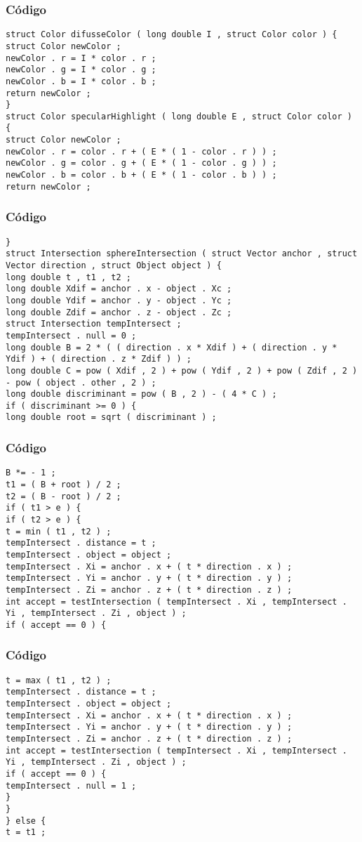 \documentclass{beamer}
\begin{document}
\begin{frame}[fragile]
\frametitle{C\'odigo}
\begin{verbatim}
struct Color difusseColor ( long double I , struct Color color ) { 
struct Color newColor ; 
newColor . r = I * color . r ; 
newColor . g = I * color . g ; 
newColor . b = I * color . b ; 
return newColor ; 
} 
struct Color specularHighlight ( long double E , struct Color color ) { 
struct Color newColor ; 
newColor . r = color . r + ( E * ( 1 - color . r ) ) ; 
newColor . g = color . g + ( E * ( 1 - color . g ) ) ; 
newColor . b = color . b + ( E * ( 1 - color . b ) ) ; 
return newColor ; 
\end{verbatim}
\end{frame}
\begin{frame}[fragile]
\frametitle{C\'odigo}
\begin{verbatim}
} 
struct Intersection sphereIntersection ( struct Vector anchor , struct Vector direction , struct Object object ) { 
long double t , t1 , t2 ; 
long double Xdif = anchor . x - object . Xc ; 
long double Ydif = anchor . y - object . Yc ; 
long double Zdif = anchor . z - object . Zc ; 
struct Intersection tempIntersect ; 
tempIntersect . null = 0 ; 
long double B = 2 * ( ( direction . x * Xdif ) + ( direction . y * Ydif ) + ( direction . z * Zdif ) ) ; 
long double C = pow ( Xdif , 2 ) + pow ( Ydif , 2 ) + pow ( Zdif , 2 ) - pow ( object . other , 2 ) ; 
long double discriminant = pow ( B , 2 ) - ( 4 * C ) ; 
if ( discriminant >= 0 ) { 
long double root = sqrt ( discriminant ) ; 
\end{verbatim}
\end{frame}
\begin{frame}[fragile]
\frametitle{C\'odigo}
\begin{verbatim}
B *= - 1 ; 
t1 = ( B + root ) / 2 ; 
t2 = ( B - root ) / 2 ; 
if ( t1 > e ) { 
if ( t2 > e ) { 
t = min ( t1 , t2 ) ; 
tempIntersect . distance = t ; 
tempIntersect . object = object ; 
tempIntersect . Xi = anchor . x + ( t * direction . x ) ; 
tempIntersect . Yi = anchor . y + ( t * direction . y ) ; 
tempIntersect . Zi = anchor . z + ( t * direction . z ) ; 
int accept = testIntersection ( tempIntersect . Xi , tempIntersect . Yi , tempIntersect . Zi , object ) ; 
if ( accept == 0 ) { 
\end{verbatim}
\end{frame}
\begin{frame}[fragile]
\frametitle{C\'odigo}
\begin{verbatim}
t = max ( t1 , t2 ) ; 
tempIntersect . distance = t ; 
tempIntersect . object = object ; 
tempIntersect . Xi = anchor . x + ( t * direction . x ) ; 
tempIntersect . Yi = anchor . y + ( t * direction . y ) ; 
tempIntersect . Zi = anchor . z + ( t * direction . z ) ; 
int accept = testIntersection ( tempIntersect . Xi , tempIntersect . Yi , tempIntersect . Zi , object ) ; 
if ( accept == 0 ) { 
tempIntersect . null = 1 ; 
} 
} 
} else { 
t = t1 ; 
\end{verbatim}
\end{frame}
\end{document}
